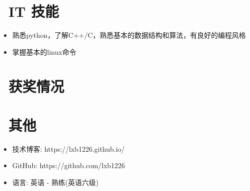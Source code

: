 \documentclass{resume}
\begin{document}

\section{\faCogs\ IT 技能}
\begin{itemize}[parsep=0.5ex]
    \item 熟悉python，了解C++/C，熟悉基本的数据结构和算法，有良好的编程风格
    \item 掌握基本的linux命令
\end{itemize}

\section{\faHeartO\ 获奖情况}

\section{\faInfo\ 其他}
\begin{itemize}[parsep=0.5ex]
    \item 技术博客: https://lxb1226.github.io/
    \item GitHub: https://github.com/lxb1226
    \item 语言: 英语 - 熟练(英语六级)
\end{itemize}

%
%
\end{document}
